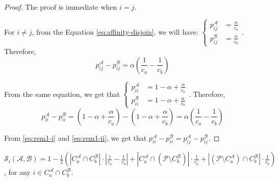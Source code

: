 \begin{proof}
    The proof is immediate when $i = j$.

    For $i \neq j$, from the Equation \ref{eq:affinity-disjoin}, we will have:
    $ 
        \displaystyle
        \begin{cases}
            p_{ij}^\mathcal{A} &= \frac{\alpha}{c_a} \\
            p_{ij}^\mathcal{B} &= \frac{\alpha}{c_b} 
        \end{cases}
    $.
    Therefore, 
    \begin{equation} \label{eq:rem1-i}
        p_{ij}^\mathcal{A} - p_{ij}^\mathcal{B} = \alpha\left(\frac{1}{c_a} - \frac{1}{c_b}\right) 
    \end{equation}

    From the same equation, we get that 
    $ 
        \displaystyle
        \begin{cases}
            p_{ii}^\mathcal{A} &= 1-\alpha + \frac{\alpha}{c_a} \\
            p_{ii}^\mathcal{B} &= 1-\alpha + \frac{\alpha}{c_b} 
        \end{cases}
    $. Therefore, 
    \begin{equation} \label{eq:rem1-ii}
        p_{ii}^\mathcal{A} - p_{ii}^\mathcal{B} = \left(1-\alpha + \frac{\alpha}{c_a}\right) - \left(1-\alpha+\frac{\alpha}{c_b}\right) = \alpha\left(\frac{1}{c_a}-\frac{1}{c_b}\right)
    \end{equation}

    From \ref{eq:rem1-i} and \ref{eq:rem1-ii}, we get that $p_{ii}^\mathcal{A} - p_{ii}^\mathcal{B} = p_{ij}^\mathcal{A} - p_{ij}^\mathcal{B}$.
\end{proof}

\begin{remark} \label{remark:ecs-constant}
    $\displaystyle\mathcal{S}_i(\mathcal{A}, \mathcal{B}) = 1-\frac{1}{2}\left(|C_a^\mathcal{A} \cap C_b^\mathcal{B}|\cdot \left|\frac{1}{c_a} - \frac{1}{c_b}\right| + |C_a^\mathcal{A} \cap (\mathcal{P} \setminus C_b^{\mathcal{B}})| \cdot \frac{1}{c_a} + |(\mathcal{P} \setminus C_a^\mathcal{A}) \cap C_b^\mathcal{B}|\cdot \frac{1}{c_b} \right)$, for any $i \in C_a^\mathcal{A} \cap C_b^\mathcal{B}$.
\end{remark}

